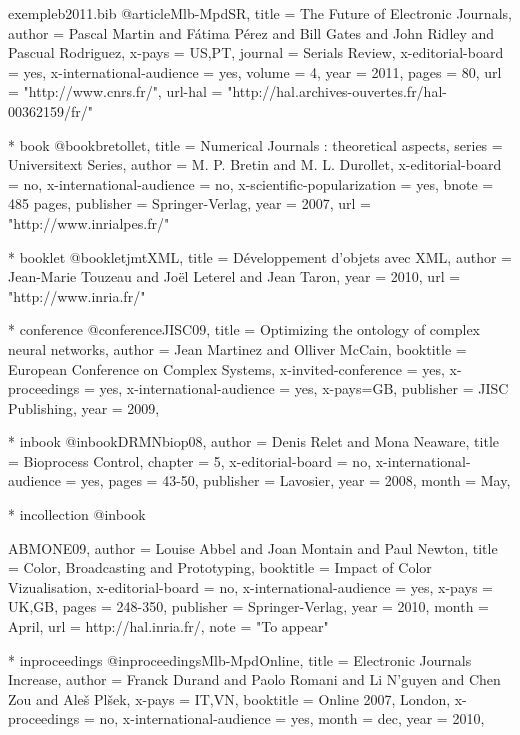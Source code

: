 \documentclass{ra2011}
\begin{document}
\begin{filecontents+}{exempleb2011.bib}
@article{Mlb-MpdSR,
title = {The Future of Electronic Journals},
author = {Pascal Martin and Fátima Pérez and Bill Gates and John Ridley and Pascual Rodriguez},
x-pays = {US,PT},
journal = {Serials Review}, 
x-editorial-board = {yes}, 
x-international-audience = {yes}, 
volume = 4, 
year = 2011, 
pages = 80, 
url =  "http://www.cnrs.fr/",
url-hal = "http://hal.archives-ouvertes.fr/hal-00362159/fr/"
} 


    * book
@book{bretollet,
title = {Numerical Journals : theoretical aspects}, 
series = {Universitext Series}, 
author = {M. P. Bretin and M. L. Durollet}, 
x-editorial-board = {no}, 
x-international-audience = {no}, 
x-scientific-popularization = {yes}, 
bnote = {485 pages}, 
publisher = {Springer-Verlag}, 
year = 2007, 
url = "http://www.inrialpes.fr/"
}


    * booklet
@booklet{jmtXML,
title = {Développement d'objets avec XML}, 
author = {Jean-Marie Touzeau and Joël Leterel and Jean Taron}, 
year = 2010, 
url =  "http://www.inria.fr/"
}
	
	
    * conference
@conference{JISC09,
title = {Optimizing the ontology of complex neural networks}, 
author = {Jean Martinez and Olliver McCain}, 
booktitle = {European Conference on Complex Systems}, 
x-invited-conference = {yes}, 
x-proceedings = {yes}, 
x-international-audience = {yes}, 
x-pays={GB},
publisher = {JISC Publishing}, 
year = 2009, 
}


    * inbook
@inbook{DRMNbiop08,
author = {Denis Relet and Mona Neaware}, 
title = {Bioprocess Control}, 
chapter = {5}, 
x-editorial-board = {no}, 
x-international-audience = {yes}, 
pages = {43-50}, 
publisher = {Lavosier}, 
year = 2008, 
month = {May}, 
}


	* incollection
@inbook{ABMONE09,
author = {Louise Abbel and Joan Montain and Paul Newton}, 
title = {Color, Broadcasting and Prototyping}, 
booktitle = {Impact of Color Vizualisation}, 
x-editorial-board = {no}, 
x-international-audience = {yes}, 
x-pays = {UK,GB},
pages = {248-350}, 
publisher = {Springer-Verlag}, 
year = 2010, 
month = {April},
url = {http://hal.inria.fr/}, 
note = "To appear"

}

 
	* inproceedings
@inproceedings{Mlb-MpdOnline,
title = {Electronic Journals Increase},
author = {Franck Durand and Paolo Romani and Li N'guyen and Chen Zou and Aleš Plšek},
x-pays = {IT,VN}, 
booktitle = {Online 2007, London}, 
x-proceedings = {no}, 
x-international-audience = {yes},
month = dec,
year = 2010,
}



\end{filecontents+}
\end{document}
